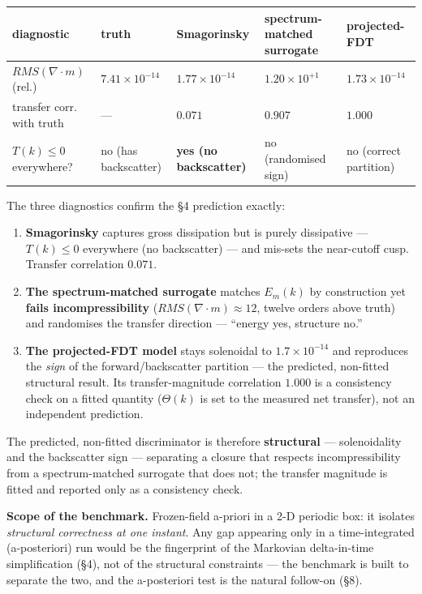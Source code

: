 \documentclass[11pt]{article}
\begin{document}
\begin{center}\small
\begin{tabularx}{\linewidth}{>{\raggedright\arraybackslash}X>{\raggedright\arraybackslash}X>{\raggedright\arraybackslash}X>{\raggedright\arraybackslash}X>{\raggedright\arraybackslash}X}
\toprule
diagnostic & truth & Smagorinsky & spectrum-matched surrogate & projected-FDT \\
\midrule
$RMS(\nabla \cdot m)$ (rel.) & $7.41\times 10^{-14}$ & $1.77\times 10^{-14}$ & \textbf{$1.20\times 10^{+1}$} & $1.73\times 10^{-14}$ \\
transfer corr. with truth & — & \textbf{$0.071$} & $0.907$ & \textbf{$1.000$} \\
$T(k)\le 0$ everywhere? & no (has backscatter) & \textbf{yes (no backscatter)} & no (randomised sign) & no (correct partition) \\
\bottomrule
\end{tabularx}
\end{center}


The three diagnostics confirm the §4 prediction exactly:


\begin{enumerate}
\item \textbf{Smagorinsky} captures gross dissipation but is purely dissipative — $T(k)\le 0$ everywhere (no backscatter) — and mis-sets the near-cutoff cusp. Transfer correlation $0.071$.
\item \textbf{The spectrum-matched surrogate} matches $E_{m}(k)$ by construction yet \textbf{fails incompressibility} ($RMS(\nabla \cdot m)\approx 12$, twelve orders above truth) and randomises the transfer direction — ``energy yes, structure no.''
\item \textbf{The projected-FDT model} stays solenoidal to $1.7\times 10^{-14}$ and reproduces the \emph{sign} of the forward/backscatter partition — the predicted, non-fitted structural result. Its transfer-magnitude correlation $1.000$ is a consistency check on a fitted quantity ($\Theta (k)$ is set to the measured net transfer), not an independent prediction.
\end{enumerate}


The predicted, non-fitted discriminator is therefore \textbf{structural} — solenoidality and the backscatter sign — separating a closure that respects incompressibility from a spectrum-matched surrogate that does not; the transfer magnitude is fitted and reported only as a consistency check.


\textbf{Scope of the benchmark.} Frozen-field a-priori in a 2-D periodic box: it isolates \emph{structural correctness at one instant}. Any gap appearing only in a time-integrated (a-posteriori) run would be the fingerprint of the Markovian delta-in-time simplification (§4), not of the structural constraints — the benchmark is built to separate the two, and the a-posteriori test is the natural follow-on (§8).
\end{document}
